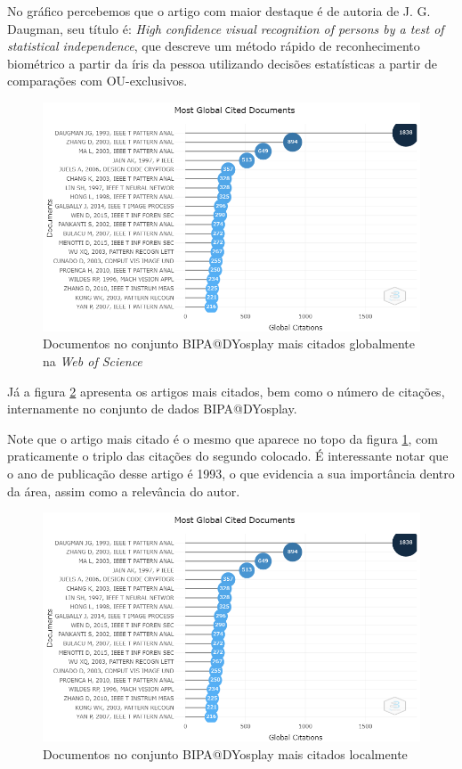 No gráfico percebemos que o artigo com maior destaque é de autoria de J. G. Daugman, seu título é: \textit{High confidence visual recognition of persons by a test of statistical independence}, que descreve um método rápido de reconhecimento biométrico a partir da íris da pessoa utilizando decisões estatísticas a partir de comparações com OU-exclusivos.

\begin{figure}[H]
    \centering
    \includegraphics[width=1\textwidth]{experiments/DYosplay/PesquisaBibliometrica/Imagens/BIPA@DYosplay_GlobalArticles.png}
    \caption{Documentos no conjunto BIPA@DYosplay mais citados globalmente na \textit{Web of Science}}
    \label{fig:GLOBALBIPA@DYOSPLAY}
\end{figure}


Já a figura \ref{fig:LOCALBIPA@DYOSPLAY} apresenta os artigos mais citados, bem como o número de citações, internamente no conjunto de dados BIPA@DYosplay.

Note que o artigo mais citado é o mesmo que aparece no topo da figura \ref{fig:GLOBALBIPA@DYOSPLAY}, com praticamente o triplo das citações do segundo colocado. É interessante notar que o ano de publicação desse artigo é 1993, o que evidencia a sua importância dentro da área, assim como a relevância do autor.

\begin{figure}[H]
    \centering
    \includegraphics[width=1\textwidth]{experiments/DYosplay/PesquisaBibliometrica/Imagens/BIPA@DYosplay_GlobalArticles.png}
    \caption{Documentos no conjunto BIPA@DYosplay mais citados localmente}
    \label{fig:LOCALBIPA@DYOSPLAY}
\end{figure}


